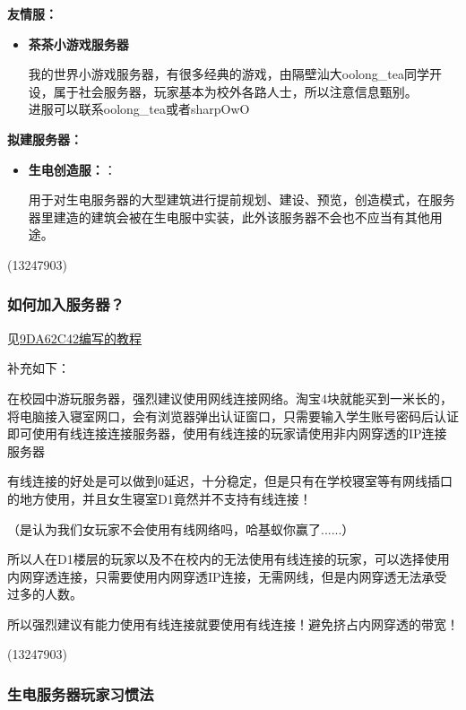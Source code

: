 \documentclass[
]{article}
\begin{document}
\textbf{友情服：}

\begin{itemize}
\item
  \textbf{茶茶小游戏服务器}

  我的世界小游戏服务器，有很多经典的游戏，由隔壁汕大oolong\_tea同学开设，属于社会服务器，玩家基本为校外各路人士，所以注意信息甄别。\\
  进服可以联系oolong\_tea或者sharpOwO
\end{itemize}

\textbf{拟建服务器：}

\begin{itemize}
\item
  \textbf{生电创造服：}：

  用于对生电服务器的大型建筑进行提前规划、建设、预览，创造模式，在服务器里建造的建筑会被在生电服中实装，此外该服务器不会也不应当有其他用途。
\end{itemize}

\begin{flushright}(13247903)\end{flushright}

\subsubsection{如何加入服务器？}\label{section-13}

见\hyperref[section-15]{9DA62C42编写的教程}

补充如下：

在校园中游玩服务器，强烈建议使用网线连接网络。淘宝4块就能买到一米长的，将电脑接入寝室网口，会有浏览器弹出认证窗口，只需要输入学生账号密码后认证即可使用有线连接连接服务器，使用有线连接的玩家请使用非内网穿透的IP连接服务器

有线连接的好处是可以做到0延迟，十分稳定，但是只有在学校寝室等有网线插口的地方使用，并且女生寝室D1竟然并不支持有线连接！

（是认为我们女玩家不会使用有线网络吗，哈基蚁你赢了......）

所以人在D1楼层的玩家以及不在校内的无法使用有线连接的玩家，可以选择使用内网穿透连接，只需要使用内网穿透IP连接，无需网线，但是内网穿透无法承受过多的人数。

所以强烈建议有能力使用有线连接就要使用有线连接！避免挤占内网穿透的带宽！

\begin{flushright}(13247903)\end{flushright}

\subsubsection{生电服务器玩家习惯法}\label{section-14}
\end{document}
